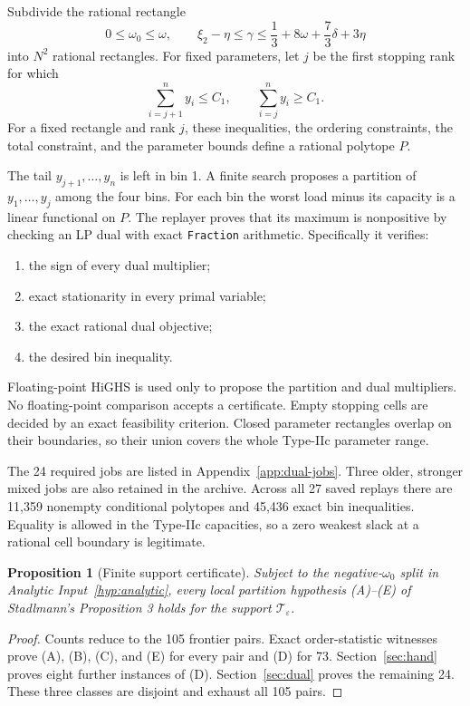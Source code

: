 \documentclass[11pt]{article}
\newtheorem{proposition}[theorem]{Proposition}
\theoremstyle{definition}
\theoremstyle{remark}
\newcommand{\TT}{\mathcal T}
\newcommand{\eps}{\varepsilon}
\newcommand{\etaP}{\eta}
\begin{document}
Subdivide the rational rectangle
\[
 0\leq\omega_0\leq\omega,
 \qquad \xi_2-\etaP\leq\gamma\leq
 \frac13+8\omega+\frac73\delta+3\etaP
\]
into \(N^2\) rational rectangles.  For fixed parameters, let \(j\) be the
first stopping rank for which
\[
 \sum_{i=j+1}^n y_i\leq C_1,
 \qquad
 \sum_{i=j}^n y_i\geq C_1.
\]
For a fixed rectangle and rank \(j\), these inequalities, the ordering
constraints, the total constraint, and the parameter bounds define a rational
polytope \(P\).

The tail \(y_{j+1},\ldots,y_n\) is left in bin 1.  A finite search proposes a
partition of \(y_1,\ldots,y_j\) among the four bins.  For each bin the worst
load minus its capacity is a linear functional on \(P\).  The replayer proves
that its maximum is nonpositive by checking an LP dual with exact
\texttt{Fraction} arithmetic.  Specifically it verifies:
\begin{enumerate}
  \item the sign of every dual multiplier;
  \item exact stationarity in every primal variable;
  \item the exact rational dual objective;
  \item the desired bin inequality.
\end{enumerate}
Floating-point HiGHS is used only to propose the partition and dual
multipliers.  No floating-point comparison accepts a certificate.  Empty
stopping cells are decided by an exact feasibility criterion.  Closed
parameter rectangles overlap on their boundaries, so their union covers the
whole Type-IIc parameter range.

The 24 required jobs are listed in Appendix~\ref{app:dual-jobs}.  Three older,
stronger mixed jobs are also retained in the archive.  Across all 27 saved
replays there are 11,359 nonempty conditional polytopes and 45,436 exact bin
inequalities.  Equality is allowed in the Type-IIc capacities, so a zero
weakest slack at a rational cell boundary is legitimate.

\begin{proposition}[Finite support certificate]
\label{prop:support}
Subject to the negative-\(\omega_0\) split in Analytic
Input~\ref{hyp:analytic}, every local partition hypothesis (A)--(E) of
Stadlmann's Proposition 3 holds for the support \(\TT_\eps\).
\end{proposition}

\begin{proof}
Counts reduce to the 105 frontier pairs.  Exact order-statistic witnesses prove
(A), (B), (C), and (E) for every pair and (D) for 73.  Section~\ref{sec:hand}
proves eight further instances of (D).  Section~\ref{sec:dual} proves the
remaining 24.  These three classes are disjoint and exhaust all 105 pairs.
\end{proof}
\end{document}
